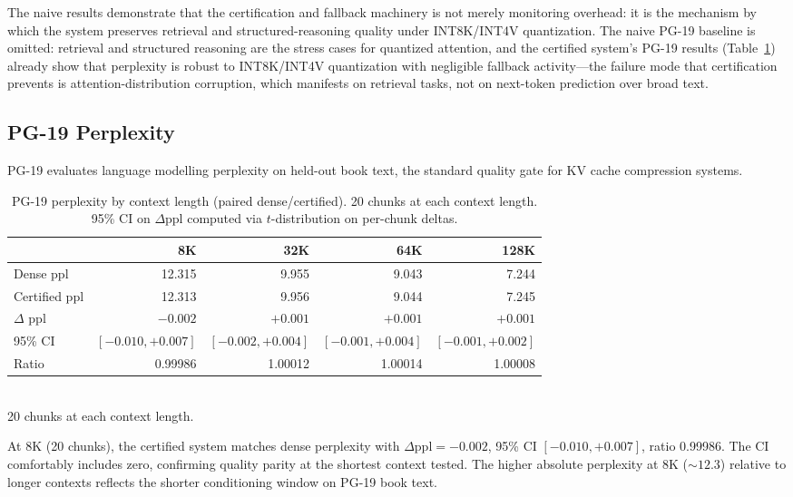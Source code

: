 \documentclass[10pt,twocolumn,a4paper]{article}
\theoremstyle{definition}
\theoremstyle{remark}
\begin{document}
The naive results demonstrate that the certification and fallback machinery is not merely monitoring overhead: it is the mechanism by which the system preserves retrieval and structured-reasoning quality under INT8K/INT4V quantization.  The naive PG-19 baseline is omitted: retrieval and structured reasoning are the stress cases for quantized attention, and the certified system's PG-19 results (Table~\ref{tab:pg19}) already show that perplexity is robust to INT8K/INT4V quantization with negligible fallback activity---the failure mode that certification prevents is attention-distribution corruption, which manifests on retrieval tasks, not on next-token prediction over broad text.

\subsection{PG-19 Perplexity}

PG-19 evaluates language modelling perplexity on held-out book text, the standard quality gate for KV cache compression systems.

\begin{table}[!t]
\centering
\caption{PG-19 perplexity by context length (paired dense/certified).  20 chunks at each context length.  95\% CI on $\Delta$ppl computed via $t$-distribution on per-chunk deltas.}
\label{tab:pg19}
\small
\begin{tabular}{lrrrr}
\toprule
& \textbf{8K} & \textbf{32K} & \textbf{64K} & \textbf{128K} \\
\midrule
Dense ppl     & 12.315 & 9.955 & 9.043 & 7.244 \\
Certified ppl & 12.313 & 9.956 & 9.044 & 7.245 \\
$\Delta$ ppl  & $-0.002$ & $+0.001$ & $+0.001$ & $+0.001$ \\
95\% CI       & $[-0.010, +0.007]$ & $[-0.002, +0.004]$ & $[-0.001, +0.004]$ & $[-0.001, +0.002]$ \\
Ratio         & 0.99986 & 1.00012 & 1.00014 & 1.00008 \\
\bottomrule
\end{tabular}
\\[2pt]
{\scriptsize 20 chunks at each context length.}
\end{table}

At 8K (20 chunks), the certified system matches dense perplexity with $\Delta\mathrm{ppl}{=}{-}0.002$, 95\% CI $[-0.010, +0.007]$, ratio 0.99986.  The CI comfortably includes zero, confirming quality parity at the shortest context tested.  The higher absolute perplexity at 8K (${\sim}12.3$) relative to longer contexts reflects the shorter conditioning window on PG-19 book text.
\end{document}
